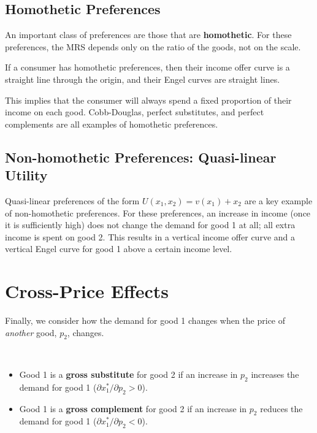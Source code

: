 \subsection{Homothetic Preferences}
An important class of preferences are those that are \textbf{homothetic}. For these preferences, the MRS depends only on the ratio of the goods, not on the scale.
\begin{proposition}
If a consumer has homothetic preferences, then their income offer curve is a straight line through the origin, and their Engel curves are straight lines.
\end{proposition}
This implies that the consumer will always spend a fixed proportion of their income on each good. Cobb-Douglas, perfect substitutes, and perfect complements are all examples of homothetic preferences.

\subsection{Non-homothetic Preferences: Quasi-linear Utility}
Quasi-linear preferences of the form $U(x_1, x_2) = v(x_1) + x_2$ are a key example of non-homothetic preferences. For these preferences, an increase in income (once it is sufficiently high) does not change the demand for good 1 at all; all extra income is spent on good 2. This results in a vertical income offer curve and a vertical Engel curve for good 1 above a certain income level.

\section{Cross-Price Effects}

Finally, we consider how the demand for good 1 changes when the price of \textit{another} good, $p_2$, changes.

\begin{definition}
~
\begin{itemize}
    \item Good 1 is a \textbf{gross substitute} for good 2 if an increase in $p_2$ increases the demand for good 1 ($\partial x_1^*/\partial p_2 > 0$).
    \item Good 1 is a \textbf{gross complement} for good 2 if an increase in $p_2$ reduces the demand for good 1 ($\partial x_1^*/\partial p_2 < 0$).
\end{itemize}
\end{definition}

